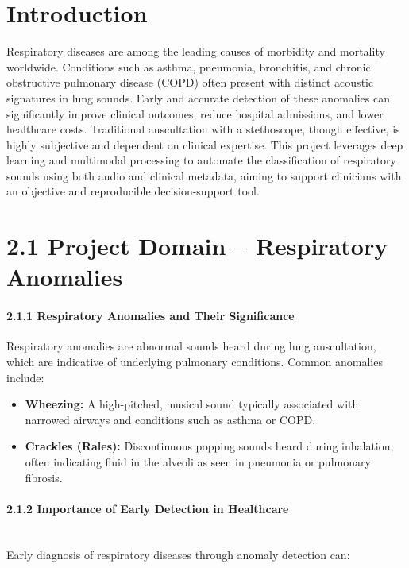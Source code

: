 
\section{Introduction}
Respiratory diseases are among the leading causes of morbidity and mortality worldwide. Conditions such as asthma, pneumonia, bronchitis, and chronic obstructive pulmonary disease (COPD) often present with distinct acoustic signatures in lung sounds. Early and accurate detection of these anomalies can significantly improve clinical outcomes, reduce hospital admissions, and lower healthcare costs. Traditional auscultation with a stethoscope, though effective, is highly subjective and dependent on clinical expertise. This project leverages deep learning and multimodal processing to automate the classification of respiratory sounds using both audio and clinical metadata, aiming to support clinicians with an objective and reproducible decision-support tool.
\newpage

\section*{2.1 Project Domain – Respiratory Anomalies}

\paragraph{2.1.1 Respiratory Anomalies and Their Significance\\}
Respiratory anomalies are abnormal sounds heard during lung auscultation, which are indicative of underlying pulmonary conditions. Common anomalies include:

\begin{itemize}
    \item \textbf{Wheezing:} A high-pitched, musical sound typically associated with narrowed airways and conditions such as asthma or COPD.
    \item \textbf{Crackles (Rales):} Discontinuous popping sounds heard during inhalation, often indicating fluid in the alveoli as seen in pneumonia or pulmonary fibrosis.
\end{itemize}

\paragraph{2.1.2 Importance of Early Detection in Healthcare\\\\}
Early diagnosis of respiratory diseases through anomaly detection can:

